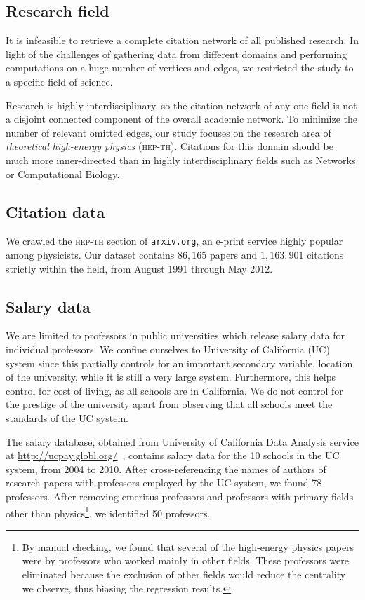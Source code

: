 \subsection{Research field}
It is infeasible to retrieve a complete citation network of all published research. In light of the challenges of gathering data from different domains and performing computations on a huge number of vertices and edges, we restricted the study to a specific field of science.

Research is highly interdisciplinary, so the citation network of any one field is not a disjoint connected component of the overall academic network. To minimize the number of relevant omitted edges, our study focuses on the research area of \emph{theoretical high-energy physics} (\textsc{hep-th}). Citations for this domain should be much more inner-directed than in highly interdisciplinary fields such as Networks or Computational Biology.

\subsection{Citation data}
We crawled the \textsc{hep-th} section of \texttt{arxiv.org}, an e-print service highly popular among physicists. Our dataset contains $86,165$ papers and $1,163,901$ citations strictly within the field, from August 1991 through May 2012.

\subsection{Salary data}
We are limited to professors in public universities which release salary data for individual professors. We confine ourselves to University of California (UC) system since this partially controls for an important secondary variable, location of the university, while it is still a very large system. Furthermore, this helps control for cost of living, as all schools are in California. We do not control for the prestige of the university apart from observing that all schools meet the standards of the UC system.

The salary database, obtained from University of California Data Analysis service at \url{http://ucpay.globl.org/}~\cite{ucpay}, contains salary data for the 10 schools in the UC system, from 2004 to 2010. After cross-referencing the names of authors of research papers with professors employed by the UC system, we found 78 professors. After removing emeritus professors and professors with primary fields other than physics\footnote{By manual checking, we found that several of the high-energy physics papers were by professors who worked mainly in other fields. These professors were eliminated because the exclusion of other fields would reduce the centrality we observe, thus biasing the regression results.}, we identified 50 professors.

